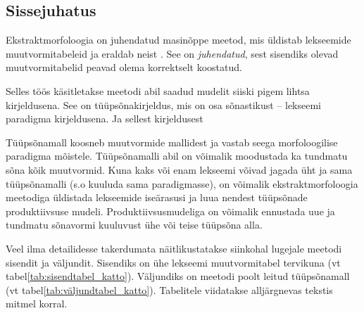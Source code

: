 \documentclass[12pt,a4paper]{article}
\begin{document}
\subsection{Sissejuhatus}
\label{sec:ekstraktmorfoloogia-sissejuhatus}

Ekstraktmorfoloogia on juhendatud masinõppe meetod, mis üldistab lekseemide muutvormitabeleid ja eraldab neist . See on \textit{juhendatud}, sest sisendiks olevad muutvormitabelid peavad olema korrektselt koostatud. %

Selles töös käsitletakse meetodi abil saadud mudelit siiski pigem lihtsa kirjeldusena. See on tüüpsõnakirjeldus, mis on osa sõnastikust -- lekseemi paradigma kirjeldusena. Ja sellest kirjeldusest 

Tüüpsõna\-mall koosneb muutvormide mallidest ja vastab seega morfoloogilise paradigma mõistele. 
Tüüpsõna\-malli abil on võimalik moodustada ka tundmatu sõna kõik muutvormid.
Kuna kaks või enam lekseemi võivad jagada üht ja sama tüüpsõna\-malli (s.o kuuluda sama paradigmasse), on võimalik ekstrakt\-morfoloogia meetodiga üldistada lekseemide iseärasusi ja luua nendest tüüpsõnade produktiivsuse mudeli. Produktiivsus\-mudeliga on võimalik ennustada uue ja tundmatu sõnavormi kuuluvust ühe või teise tüüpsõna alla. 


Veel ilma detailidesse takerdumata näitlikustatakse siinkohal lugejale meetodi sisendit ja väljundit. Sisendiks on ühe lekseemi muutvormitabel tervikuna (vt tabel\nobreakspace \ref{tab:sisendtabel_katto}). Väljundiks on meetodi poolt leitud tüüpsõnamall (vt tabel\nobreakspace \ref{tab:väljundtabel_katto}). Tabelitele viidatakse alljärgnevas tekstis mitmel korral.
\end{document}
